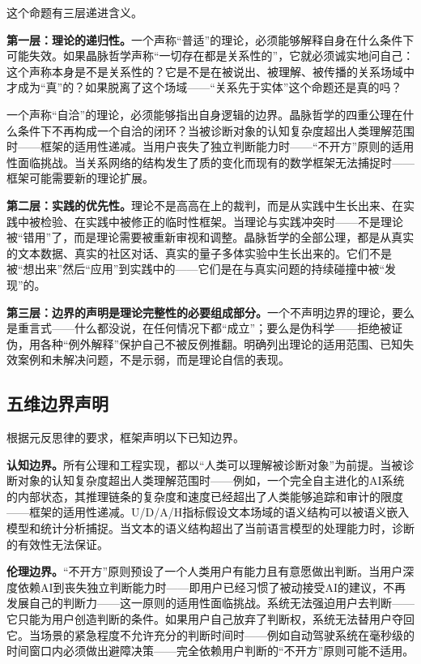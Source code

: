 \documentclass[11pt,a4paper]{book}
\theoremstyle{definition}
\begin{document}
这个命题有三层递进含义。

\textbf{第一层：理论的递归性。}一个声称“普适”的理论，必须能够解释自身在什么条件下可能失效。如果晶脉哲学声称“一切存在都是关系性的”，它就必须诚实地问自己：这个声称本身是不是关系性的？它是不是在被说出、被理解、被传播的关系场域中才成为“真”的？如果脱离了这个场域——“关系先于实体”这个命题还是真的吗？

一个声称“自洽”的理论，必须能够指出自身逻辑的边界。晶脉哲学的四重公理在什么条件下不再构成一个自洽的闭环？当被诊断对象的认知复杂度超出人类理解范围时——框架的适用性递减。当用户丧失了独立判断能力时——“不开方”原则的适用性面临挑战。当关系网络的结构发生了质的变化而现有的数学框架无法捕捉时——框架可能需要新的理论扩展。

\textbf{第二层：实践的优先性。}理论不是高高在上的裁判，而是从实践中生长出来、在实践中被检验、在实践中被修正的临时性框架。当理论与实践冲突时——不是理论被“错用”了，而是理论需要被重新审视和调整。晶脉哲学的全部公理，都是从真实的文本数据、真实的社区对话、真实的量子多体实验中生长出来的。它们不是被“想出来”然后“应用”到实践中的——它们是在与真实问题的持续碰撞中被“发现”的。

\textbf{第三层：边界的声明是理论完整性的必要组成部分。}一个不声明边界的理论，要么是重言式——什么都没说，在任何情况下都“成立”；要么是伪科学——拒绝被证伪，用各种“例外解释”保护自己不被反例推翻。明确列出理论的适用范围、已知失效案例和未解决问题，不是示弱，而是理论自信的表现。

\subsection{五维边界声明}

根据元反思律的要求，框架声明以下已知边界。

\textbf{认知边界。}所有公理和工程实现，都以“人类可以理解被诊断对象”为前提。当被诊断对象的认知复杂度超出人类理解范围时——例如，一个完全自主进化的AI系统的内部状态，其推理链条的复杂度和速度已经超出了人类能够追踪和审计的限度——框架的适用性递减。U/D/A/H指标假设文本场域的语义结构可以被语义嵌入模型和统计分析捕捉。当文本的语义结构超出了当前语言模型的处理能力时，诊断的有效性无法保证。

\textbf{伦理边界。}“不开方”原则预设了一个人类用户有能力且有意愿做出判断。当用户深度依赖AI到丧失独立判断能力时——即用户已经习惯了被动接受AI的建议，不再发展自己的判断力——这一原则的适用性面临挑战。系统无法强迫用户去判断——它只能为用户创造判断的条件。如果用户自己放弃了判断权，系统无法替用户夺回它。当场景的紧急程度不允许充分的判断时间时——例如自动驾驶系统在毫秒级的时间窗口内必须做出避障决策——完全依赖用户判断的“不开方”原则可能不适用。
\end{document}
